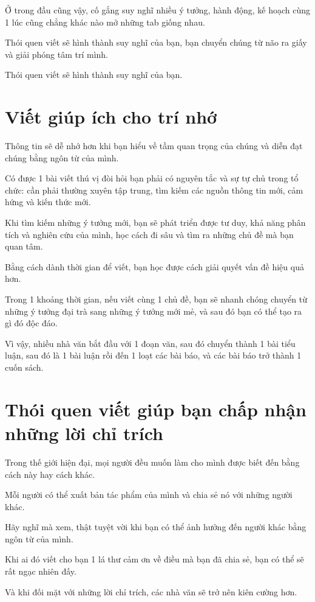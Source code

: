 \documentclass{book}
\numberwithin{equation}{section}
\begin{document}
Ở trong đầu cũng vậy, cố gắng suy nghĩ nhiều ý tưởng, hành động, kế hoạch cùng 1 lúc cũng chẳng khác nào mở những tab giống nhau.

Thói quen viết sẽ hình thành suy nghĩ của bạn, bạn chuyển chúng từ não ra giấy và giải phóng tâm trí mình.

\textsf{Thói quen viết sẽ hình thành suy nghĩ của bạn.}

\section{Viết giúp ích cho trí nhớ}
Thông tin sẽ dễ nhớ hơn khi bạn hiểu về tầm quan trọng của chúng và diễn đạt chúng bằng ngôn từ của mình.

Có được 1 bài viết thú vị đòi hỏi bạn phải có nguyên tắc và sự tự chủ trong tổ chức: cần phải thường xuyên tập trung, tìm kiếm các nguồn thông tin mới, cảm hứng và kiến thức mới.

%
Khi tìm kiếm những ý tưởng mới, bạn sẽ phát triển được tư duy, khả năng phân tích và nghiên cứu của mình, học cách đi sâu và tìm ra những chủ đề mà bạn quan tâm.

Bằng cách dành thời gian để viết, bạn học được cách giải quyết vấn đề hiệu quả hơn.

%
Trong 1 khoảng thời gian, nếu viết cùng 1 chủ đề, bạn sẽ nhanh chóng chuyển từ những ý tưởng đại trà sang những ý tưởng mới mẻ, và sau đó bạn có thể tạo ra gì đó độc đáo.

Vì vậy, nhiều nhà văn bắt đầu với 1 đoạn văn, sau đó chuyển thành 1 bài tiểu luận, sau đó là 1 bài luận rồi đến 1 loạt các bài báo, và các bài báo trở thành 1 cuốn sách.

\section{Thói quen viết giúp bạn chấp nhận những lời chỉ trích}
Trong thế giới hiện đại, mọi người đều muốn làm cho mình được biết đến bằng cách này hay cách khác.

Mỗi người có thể xuất bản tác phẩm của mình và chia sẻ nó với những người khác.

%
Hãy nghĩ mà xem, thật tuyệt vời khi bạn có thể ảnh hưởng đến người khác bằng ngôn từ của mình.

Khi ai đó viết cho bạn 1 lá thư cảm ơn về điều mà bạn đã chia sẻ, bạn có thể sẽ rất ngạc nhiên đấy.

%
Và khi đối mặt với những lời chỉ trích, các nhà văn sẽ trở nên kiên cường hơn.
\end{document}
